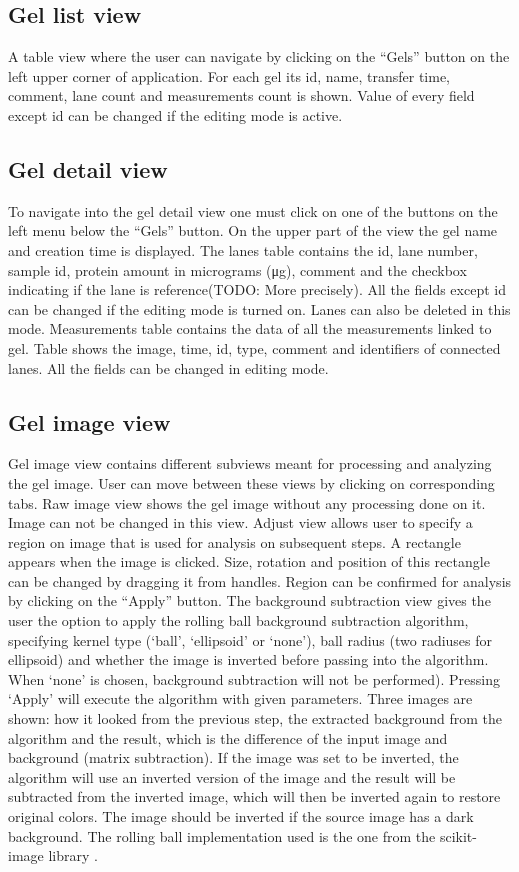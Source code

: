 \subsection{Gel list view}
A table view where the user can navigate by clicking on the “Gels” button on the left upper corner of application. For each gel its id, name, transfer time, comment, lane count and measurements count is shown. Value of every field except id can be changed if the editing mode is active.

\subsection{Gel detail view}
To navigate into the gel detail view one must click on one of the buttons on the left menu below the “Gels” button. On the upper part of the view the gel name and creation time is displayed.
The lanes table contains the id, lane number, sample id, protein amount in micrograms (μg), comment and the checkbox indicating if the lane is reference(TODO: More precisely). All the fields except id can be changed if the editing mode is turned on. Lanes can also be deleted in this mode.
Measurements table contains the data of all the measurements linked to gel. Table shows the image, time, id, type, comment and identifiers of connected lanes. All the fields can be changed in editing mode. 

\subsection{Gel image view}
Gel image view contains different subviews meant for processing and analyzing the gel image. User can move between these views by clicking on corresponding tabs.
Raw image view shows the gel image without any processing done on it. Image can not be changed in this view.
Adjust view allows user to specify a region on image that is used for analysis on subsequent steps. A rectangle appears when the image is clicked. Size, rotation and position of this rectangle can be changed by dragging it from handles. Region can be confirmed for analysis by clicking on the “Apply” button.
The background subtraction view gives the user the option to apply the rolling ball background subtraction algorithm, specifying kernel type (‘ball’, ‘ellipsoid’ or ‘none’), ball radius (two radiuses for ellipsoid) and whether the image is inverted before passing into the algorithm. When ‘none’ is chosen, background subtraction will not be performed). Pressing ‘Apply’ will execute the algorithm with given parameters. Three images are shown: how it looked from the previous step, the extracted background from the algorithm and the result, which is the difference of the input image and background (matrix subtraction). If the image was set to be inverted, the algorithm will use an inverted version of the image and the result will be subtracted from the inverted image, which will then be inverted again to restore original colors. The image should be inverted if the source image has a dark background. The rolling ball implementation used is the one from the scikit-image library \cite{rolling-ball}.

